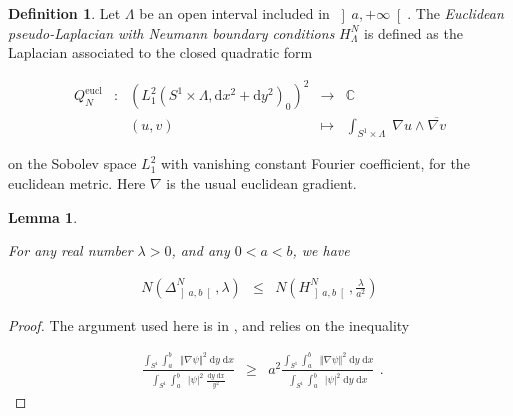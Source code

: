 \documentclass{jams-l}
\newtheorem{lemma}[theorem]{Lemma}
\theoremstyle{definition}
\newtheorem{definition}[theorem]{Definition}
\theoremstyle{remark}
\numberwithin{equation}{section}
\begin{document}
        \begin{definition}
        
            Let $\Lambda$ be an open interval included in $\left] a, +\infty \right[$. The \textit{Euclidean pseudo-Laplacian with Neumann boundary conditions} $H^N_{\Lambda}$ is defined as the Laplacian associated to the closed quadratic form
            
            \[ \begin{array}{lllll}
                    Q_N^{\mathrm{eucl}} & : & \left( L_1^2 \left( S^1 \times \Lambda, \mathrm{d}x^2 + \mathrm{d}y^2 \right)_0 \right)^2 & \longrightarrow & \mathbb{C} \\[0.5em]
                    
                    && \left( u,v \right) & \longmapsto & \int_{S^1 \times \Lambda} \; \nabla u \wedge \overline{\nabla v}
                \end{array} \]
                
            \noindent on the Sobolev space $L_1^2$ with vanishing constant Fourier coefficient, for the euclidean metric. Here $\nabla$ is the usual euclidean gradient.
        
        \end{definition}
        
        \begin{lemma}
        \label{LemmaNeumannLaplacianPoincaréEuclidean}
        
            For any real number $\lambda > 0$, and any $0 < a < b$, we have
            
            \[ \begin{array}{lll}
                    N \left( \Delta^N_{\left] a,b \right[}, \lambda \right) & \leqslant &  N \left( H^N_{\left] a,b \right[}, \frac{\lambda}{a^2} \right)
                \end{array} \]
        
        \end{lemma}
        
        \begin{proof}
        
            The argument used here is in \cite[Lem. 4.2]{MR699488}, and relies on the inequality
            
            \[ \begin{array}{lll}
                    \frac{\int_{S^1} \int_{a_{\phantom{a}}}^{b} \; \left \Vert \nabla \psi \right \Vert^2 \; \mathrm{d}y \; \mathrm{d}x}{\int_{S^1} \int_a^{b^{\phantom{a}}} \; \left \vert \psi \right \vert^2 \; \frac{\mathrm{d}y \; \mathrm{d}x}{y^2}} & \geqslant & a^2 \frac{\int_{S^1} \int_{a_{\phantom{a}}}^{b} \; \left \Vert \nabla \psi \right \Vert^2 \; \mathrm{d}y \; \mathrm{d}x}{\int_{S^1} \int_a^{b^{\phantom{a}}} \; \left \vert \psi \right \vert^2 \; \mathrm{d}y \; \mathrm{d}x}
                \end{array} . \]
        
        \end{proof}
        
\end{document}

